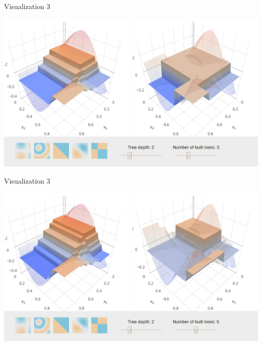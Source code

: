 \begin{vbframe}{Visualization 3}
\begin{center}
\includegraphics[width=\textwidth]{figure_man/gbm_anim/gbm3.jpg}
\href{http://arogozhnikov.github.io/2016/06/24/gradient_boosting_explained.html}{}
\end{center}
\addtocounter{framenumber}{-1}
\end{vbframe}


\begin{vbframe}{Visualization 3}
\begin{center}
\includegraphics[width=\textwidth]{figure_man/gbm_anim/gbm5.jpg}
\href{http://arogozhnikov.github.io/2016/06/24/gradient_boosting_explained.html}{}
\end{center}
\addtocounter{framenumber}{-1}
\end{vbframe}

